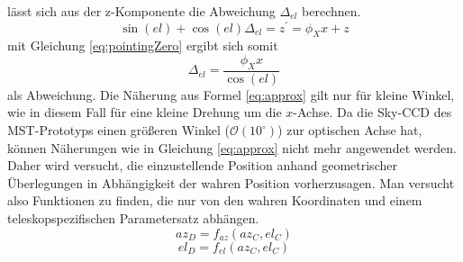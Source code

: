 lässt sich aus der z-Komponente die Abweichung $\Delta_{el}$ berechnen.
\begin{equation}
\sin(el)+\cos(el)\Delta_{el}=z^{\prime}=\phi_Xx+z
\end{equation}
mit Gleichung \ref{eq:pointingZero} ergibt sich somit 
\begin{equation}
\Delta_{el}=\frac{\phi_Xx}{\cos(el)}
\end{equation}
als Abweichung. Die Näherung aus Formel \ref{eq:approx} gilt nur für kleine Winkel, wie in diesem Fall für eine kleine Drehung um die $x$-Achse.
Da die Sky-CCD des MST-Prototyps einen größeren Winkel ($\mathcal{O}\left(10^{\circ}\right)$) zur optischen Achse hat, können Näherungen wie in Gleichung \ref{eq:approx} nicht mehr angewendet werden. Daher wird versucht, die einzustellende Position anhand geometrischer Überlegungen in Abhängigkeit der wahren Position vorherzusagen. Man versucht also Funktionen zu finden, die nur von den wahren Koordinaten und einem teleskopspezifischen Parametersatz abhängen.
\begin{equation} 
az_D=f_{az}(az_C,el_C)
\end{equation}
\begin{equation}
el_D=f_{el}(az_C,el_C)
\label{eq:pointingprinciple}
\end{equation}

